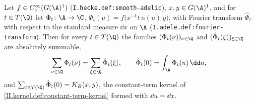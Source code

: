 Let $f\in C_c^\infty(G(\A)^1)$ (\texttt{I.hecke.def:smooth-adelic}), $x,y\in G(\A)^1$, and for $t\in T(\Q)$ let
$\Phi_t\colon\A\to\C$, $\Phi_t(u)=f\bigl(x^{-1}t\,n(u)\,y\bigr)$, with Fourier transform $\hat\Phi_t$ with respect to the standard measure
$\dd x$ on $\A$ (\texttt{I.adele.def:fourier-transform}). Then for every $t\in T(\Q)$ the families $(\Phi_t(\nu))_{\nu\in\Q}$ and
$(\hat\Phi_t(\xi))_{\xi\in\Q}$ are absolutely summable,
\[
  \sum_{\nu\in\Q}\Phi_t(\nu)=\sum_{\xi\in\Q}\hat\Phi_t(\xi),\qquad\hat\Phi_t(0)=\int_\A\Phi_t(u)\,\dd u,
\]
and $\sum_{t\in T(\Q)}\hat\Phi_t(0)=K_B(x,y)$, the constant-term kernel of \cref{II.kernel.def:constant-term-kernel} formed with $\dd u=\dd x$.
